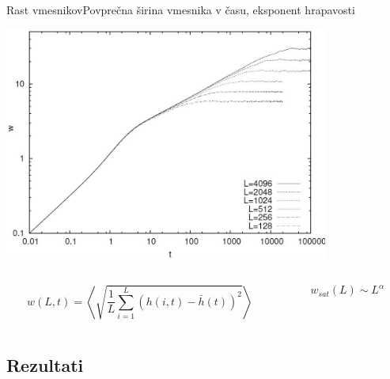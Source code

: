\documentclass{beamer}
\begin{document}
\begin{frame}{Rast vmesnikov}{Povprečna širina vmesnika v času, eksponent hrapavosti}
\begin{center}
  \footnotesize
  \includegraphics[width=0.8\textwidth]{slike/sirine-vmesnika}

\begin{columns}
  \begin{column}{0.6\textwidth}
    \begin{equation} w(L,t) = \left\langle \sqrt{\frac{1}{L} \sum_{i=1}^L (h(i,t)-\bar{h}(t))^2} \right\rangle \end{equation}
  \end{column}
  \begin{column}{0.4\textwidth}
    \begin{equation} w_{sat}(L) \sim L^\alpha \end{equation}
  \end{column}
\end{columns}
\end{center}
\end{frame}


\subsection{Rezultati}
\end{document}
